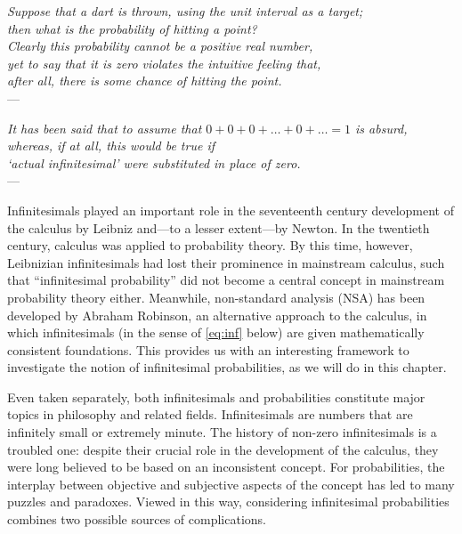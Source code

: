\begin{flushright}
    {\footnotesize \textit{Suppose that a dart is thrown, using the unit interval as a target;\\
    then what is the probability of hitting a point?\\
    Clearly this probability cannot be a positive real number,\\
    yet to say that it is zero violates the intuitive feeling that,\\
    after all, there is some chance of hitting the point.}\\
    ---\citet[p.~171]{BernsteinWattenberg:1969}}
\end{flushright}

\begin{flushright}
    {\footnotesize \textit{It has been said that to assume that $0+0+0+ \ldots +0+ \ldots =1$ is absurd,\\
    whereas, if at all, this would be true if\\
    `actual infinitesimal' were substituted in place of zero.}\\
    ---\citet[p.~347]{deFinetti:1974}}\label{quote:dF}
\end{flushright}

Infinitesimals played an important role in the seventeenth century development of the calculus by Leibniz and---to a lesser extent---by Newton. In the twentieth century, calculus was applied to probability theory. By this time, however, Leibnizian infinitesimals had lost their prominence in mainstream calculus, such that ``infinitesimal probability'' did not become a central concept in mainstream probability theory either. Meanwhile, non-standard analysis (NSA) has been developed by Abraham Robinson, an alternative approach to the calculus, in which infinitesimals (in the sense of \autoref{eq:inf} below) are given mathematically consistent foundations. This provides us with an interesting framework to investigate the notion of infinitesimal probabilities, as we will do in this chapter.

Even taken separately, both infinitesimals and probabilities constitute major topics in philosophy and related fields.
Infinitesimals are numbers that are infinitely small or extremely minute. The history of non-zero infinitesimals is a troubled one: despite their crucial role in the development of the calculus, they were long believed to be based on an inconsistent concept.
For probabilities, the interplay between objective and subjective aspects of the concept has led to many puzzles and paradoxes.
Viewed in this way, considering infinitesimal probabilities combines two possible sources of complications.

